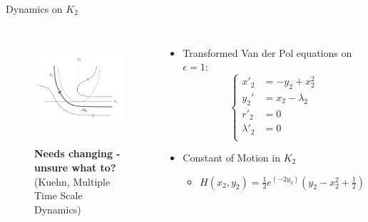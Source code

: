 \documentclass[11pt]{beamer}
\begin{document}
\begin{frame}{Dynamics on $K_2$}
\begin{columns}
\begin{figure}
    \centering
    \includegraphics[height=4cm,width=6cm]{Dynamics_in_K2.png}
    \caption{\textbf{Needs changing - unsure what to?} (Kuehn, Multiple Time Scale Dynamics)}

\end{figure}
\begin{itemize}
\item Transformed Van der Pol equations on $ \epsilon=1$:
\begin{equation*}
    \begin{cases}
        x'_2&=-y_2+x_2^2\\
         y_2'&=x_2-\lambda_2\\
        r'_2&=0\\
        \lambda'_2&=0\\
    \end{cases}
\end{equation*}
\item Constant of Motion in $ K_2 $
\begin{itemize}
	\item $H(x_2,y_2)=\frac{1}{2}e^{(-2y_2)}\left(y_2-x^2_2+\frac{1}{2}\right)$
\end{itemize}

\end{itemize}
\end{columns}
\end{frame}
\end{document}
